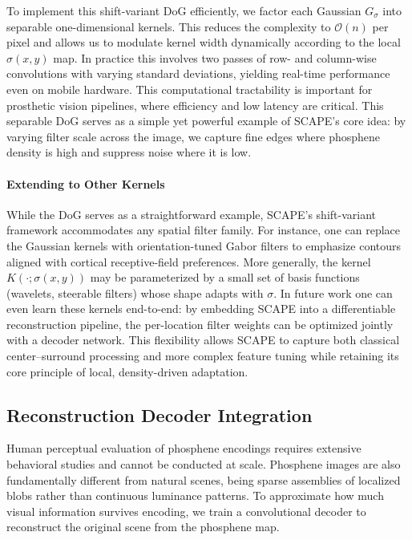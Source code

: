 To implement this shift-variant DoG efficiently, we factor each Gaussian $G_{\sigma}$ into separable one-dimensional kernels. 
This reduces the complexity to $\mathcal{O}(n)$ per pixel and allows us to modulate kernel width dynamically according to the local $\sigma(x,y)$ map. 
In practice this involves two passes of row- and column-wise convolutions with varying standard deviations, yielding real-time performance even on mobile hardware. 
This computational tractability is important for prosthetic vision pipelines, where efficiency and low latency are critical. 
This separable DoG serves as a simple yet powerful example of SCAPE’s core idea: by varying filter scale across the image, we capture fine edges where phosphene density is high and suppress noise where it is low.

\paragraph{Extending to Other Kernels}
While the DoG serves as a straightforward example, SCAPE’s shift-variant framework accommodates any spatial filter family.  For instance, one can replace the Gaussian kernels with orientation-tuned Gabor filters to emphasize contours aligned with cortical receptive-field preferences. More generally, the kernel \(K(\cdot;\sigma(x,y))\) may be parameterized by a small set of basis functions (wavelets, steerable filters) whose shape adapts with \(\sigma\).  In future work one can even learn these kernels end-to-end: by embedding SCAPE into a differentiable reconstruction pipeline, the per-location filter weights can be optimized jointly with a decoder network.  This flexibility allows SCAPE to capture both classical center–surround processing and more complex feature tuning while retaining its core principle of local, density-driven adaptation.  


\subsection{Reconstruction Decoder Integration}
Human perceptual evaluation of phosphene encodings requires extensive behavioral studies and cannot be conducted at scale. Phosphene images are also fundamentally different from natural scenes, being sparse assemblies of localized blobs rather than continuous luminance patterns. To approximate how much visual information survives encoding, we train a convolutional decoder to reconstruct the original scene from the phosphene map.

